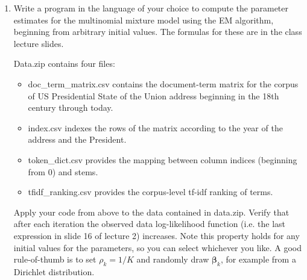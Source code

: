 \documentclass[12pt,a4paper]{article}
\begin{document}
 

\begin{enumerate}

\item Write a program in the language of your choice to compute the parameter estimates for the multinomial mixture model using the EM algorithm, beginning from arbitrary initial values.  The formulas for these are in the class lecture slides.

  Data.zip contains four files:
  \begin{itemize}
  \item doc\_term\_matrix.csv contains the document-term matrix for the corpus of US Presidential State of the Union address beginning in the 18th century through today.
  \item index.csv indexes the rows of the matrix according to the year of the address and the President.
  \item token\_dict.csv provides the mapping between column indices (beginning from 0) and stems.
  \item tfidf\_ranking.csv provides the corpus-level tf-idf ranking of terms.
  \end{itemize}

Apply your code from above to the data contained in data.zip.  Verify that after each iteration the observed data log-likelihood function (i.e. the last expression in slide 16 of lecture 2) increases.  Note this property holds for any initial values for the parameters, so you can select whichever you like.  A good rule-of-thumb is to set $\rho_k = 1/K$ and randomly draw $\boldsymbol\beta_k$, for example from a Dirichlet distribution.

\end{enumerate}
\end{document}
